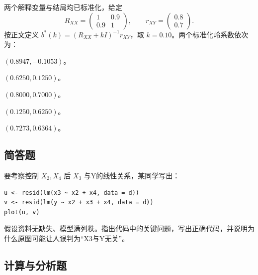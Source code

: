 \par\addvspace{6pt}\noindent\begin{minipage}{\linewidth}


两个解释变量与结局均已标准化，给定 \[R_{XX}=\begin{pmatrix}1&0.9\\0.9&1\end{pmatrix},\qquad
r_{XY}=\begin{pmatrix}0.8\\0.7\end{pmatrix}.\] 按正文定义 \(b^*(k)=(R_{XX}+kI)^{-1}r_{XY}\)，取 \(k=0.10\)。两个标准化岭系数依次为：


\begin{choices}

\item \((0.8947,-0.1053)\)。

\item \((0.6250,0.1250)\)。

\item \((0.8000,0.7000)\)。

\item \((0.1250,0.6250)\)。

\item \((0.7273,0.6364)\)。

\end{choices}

\end{minipage}\par\vspace{4pt}

\subsection{简答题}


要考察控制 \(X_2,X_4\) 后 \(X_3\) 与Y的线性关系，某同学写出：

\begin{verbatim}
u <- resid(lm(x3 ~ x2 + x4, data = d))
v <- resid(lm(y ~ x2 + x3 + x4, data = d))
plot(u, v)
\end{verbatim}

假设资料无缺失、模型满列秩。指出代码中的关键问题，写出正确代码，并说明为什么原图可能让人误判为``X3与Y无关''。



\subsection{计算与分析题}

